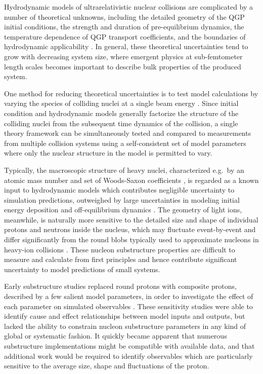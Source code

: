 \documentclass[aps,prc,reprint,amsmath,nofootinbib]{revtex4-1}
\begin{document}
Hydrodynamic models of ultrarelativistic nuclear collisions are complicated by a number of theoretical unknowns, including the detailed geometry of the QGP initial conditions, the strength and duration of pre-equilibrium dynamics, the temperature dependence of QGP transport coefficients, and the boundaries of hydrodynamic applicability \cite{Niemi:2014lha, deSouza:2015ena, Ollitrault:2012cm, Song:2012ua}.
In general, these theoretical uncertainties tend to grow with decreasing system size, where emergent physics at sub-femtometer length scales becomes important to describe bulk properties of the produced system.

One method for reducing theoretical uncertainties is to test model calculations by varying the species of colliding nuclei at a single beam energy \cite{Adare:2015bua, Schenke:2014tga, Aidala:2018mcw, Adare:2017wlc, Adamczyk:2015obl, Shen:2016zpp, Aidala:2017ajz, Adare:2006ti}.
Since initial condition and hydrodynamic models generally factorize the structure of the colliding nuclei from the subsequent time dynamics of the collision, a single theory framework can be simultaneously tested and compared to measurements from multiple collision systems using a self-consistent set of model parameters where only the nuclear structure in the model is permitted to vary.

Typically, the macroscopic structure of heavy nuclei, characterized e.g.\ by an atomic mass number and set of Woods-Saxon coefficients \cite{MOLLER1995185, DEVRIES1987495}, is regarded as a known input to hydrodynamic models which contributes negligible uncertainty to simulation predictions, outweighed by large uncertainties in modeling initial energy deposition and off-equilibrium dynamics \cite{Niemi:2014lha, Song:2011hk, Retinskaya:2013gca, Liu:2015nwa, Kurkela:2016vts}.
The geometry of light ions, meanwhile, is naturally more sensitive to the detailed size and shape of individual protons and neutrons inside the nucleus, which may fluctuate event-by-event and differ significantly from the round blobs typically used to approximate nucleons in heavy-ion collisions \cite{Schenke:2014zha, Welsh:2016siu, Moreland:2017kdx, Schenke:2014gaa, Schlichting:2014ipa}.
These nucleon substructure properties are difficult to measure and calculate from first principles and hence contribute significant uncertainty to model predictions of small systems.

Early substructure studies replaced round protons with composite protons, described by a few salient model parameters, in order to investigate the effect of each parameter on simulated observables \cite{Adler:2013aqf, Mitchell:2016jio, Welsh:2016siu, Broniowski:2016pvx, Bozek:2017jog}.
These sensitivity studies were able to identify cause and effect relationships between model inputs and outputs, but lacked the ability to constrain nucleon substructure parameters in any kind of global or systematic fashion.
It quickly became apparent that numerous substructure implementations might be compatible with available data, and that additional work would be required to identify observables which are particularly sensitive to the average size, shape and fluctuations of the proton.
\end{document}
